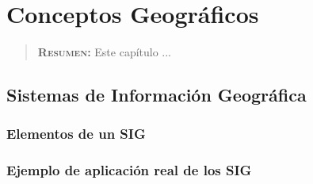 

\chapter{Conceptos Geográficos}
\label{ch:sig}

\begin{quote}
  {\bf\textsc{Resumen:}} Este capítulo ...
\end{quote}


\section{Sistemas de Información Geográfica}






\subsection{Elementos de un SIG}


\subsection{Ejemplo de aplicación real de los SIG}



